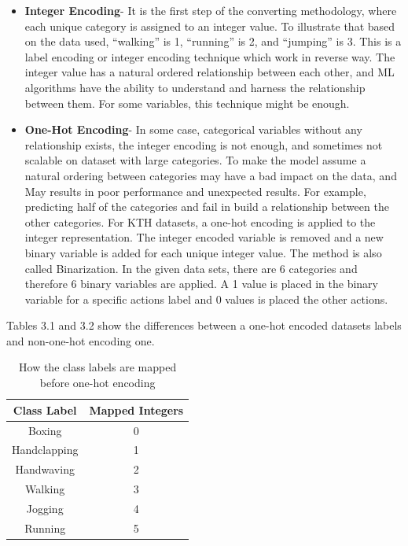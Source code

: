 \begin{itemize}
\item \textbf{Integer Encoding}- It is the first step of the converting methodology, where each unique category is assigned to an integer value. To illustrate that based on the data used, “walking” is 1, “running” is 2, and “jumping” is 3. This is a label encoding or integer encoding technique which work in reverse way. The integer value has a natural ordered relationship between each other, and ML algorithms have the ability to understand and harness the relationship between them.  For some variables, this technique might be enough.
\item \textbf{One-Hot Encoding}- In some case, categorical variables without any relationship exists, the integer encoding is not enough, and sometimes not scalable on dataset with large categories. To make the model assume a natural ordering between categories may have a bad impact on the data, and May results in poor performance and unexpected results. For example, predicting half of the categories and fail in build a relationship between the other categories. For KTH datasets, a one-hot encoding is applied to the integer representation. The integer encoded variable is removed and a new binary variable is added for each unique integer value. The method is also called Binarization. In the given data sets, there are 6 categories and therefore 6 binary variables are applied. A 1 value is placed in the binary variable for a specific actions label and 0 values is placed the other actions.
\end{itemize}

Tables 3.1 and 3.2 show the differences between a one-hot encoded datasets labels and non-one-hot encoding one.
\hspace{5mm} 
\begin{table}[]
\centering
\begin{tabular}{|c|c|}
\hline
\textbf{Class Label} & \textbf{Mapped Integers} \\ \hline
Boxing               & 0                        \\ \hline
Handclapping         & 1                        \\ \hline
Handwaving           & 2                        \\ \hline
Walking              & 3                        \\ \hline
Jogging              & 4                        \\ \hline
Running              & 5                        \\ \hline
\end{tabular}
\caption{How the class labels are mapped before one-hot encoding}
\label{my-label}
\end{table}

